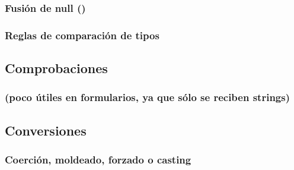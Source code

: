 \documentclass[a4paper,11pt,spanish]{sphinxmanual}
\begin{document}
\subsubsection{Fusión de null ()}
\label{\detokenize{contenidos:id82}}

\subsubsection{Reglas de comparación de tipos}
\label{\detokenize{contenidos:id83}}

\subsection{Comprobaciones}
\label{\detokenize{contenidos:id84}}

\subsubsection{}
\label{\detokenize{contenidos:id85}}

\subsubsection{ (poco útiles en formularios, ya que sólo se reciben strings)}
\label{\detokenize{contenidos:id86}}

\subsubsection{}
\label{\detokenize{contenidos:id87}}

\subsubsection{}
\label{\detokenize{contenidos:id88}}

\subsection{Conversiones}
\label{\detokenize{contenidos:id89}}

\subsubsection{Coerción, moldeado, forzado o casting}
\label{\detokenize{contenidos:id90}}
\end{document}
